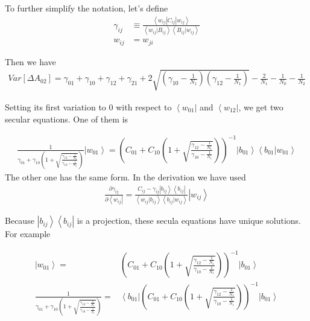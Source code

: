 \documentclass[notitlepage, amsmath, amssymb, aps]{revtex4-1}
\begin{document}
To further simplify the notation, let's define
\begin{align}
    \gamma_{ij} &\equiv \frac{\left<w_{ij}|C_{ij}|w_{ij}\right>}{\left<w_{ij}|B_{ij}\right>\left<B_{ij}|w_{ij}\right>} \\
    w_{ij} &= w_{ji}
\end{align}

Then we have
\begin{align}
    Var[\Delta A_{02}] = \gamma_{01} + \gamma_{10} + \gamma_{12} + \gamma_{21}
                        + 2\sqrt{\left(\gamma_{10} - \frac{1}{N_1}\right)\left(\gamma_{12} - \frac{1}{N_1}\right)}
                        - \frac{2}{N_1} - \frac{1}{N_0} - \frac{1}{N_2}
    \label{eq:var_02}
\end{align}

Setting its first variation to 0 with respect to $\left<w_{01}\right|$ and $\left<w_{12}\right|$, we get two secular equations.
One of them is

\begin{align}
    \frac{1}{\gamma_{01}+\gamma_{10}\left(1+\sqrt{\frac{\gamma_{12}-\frac{1}{N_1}}{\gamma_{10}-\frac{1}{N_1}}}\right)} \left|w_{01}\right> = \left(C_{01}+C_{10}\left(1+\sqrt{\frac{\gamma_{12}-\frac{1}{N_1}}{\gamma_{10}-\frac{1}{N_1}}}\right) \right)^{-1} \left|b_{01}\right>\left<b_{01}|w_{01}\right> 
\end{align}
The other one has the same form.
In the derivation we have used
\begin{align}
    \frac{\partial\gamma_{ij}}{\partial \left<w_{ij}\right|} = \frac{C_{ij} - \gamma_{ij}\left|b_{ij}\right>\left<b_{ij}\right|}{\left<w_{ij}|b_{ij}\right>\left<b_{ij}|w_{ij} \right>}\left|w_{ij}\right>
\end{align}

Because $\left|b_{ij}\right>\left<b_{ij}\right|$ is a projection, these secula equations have unique solutions.
For example

\begin{align}
    \left|w_{01}\right> = & \left(C_{01} + C_{10}\left(1+ \sqrt{\frac{\gamma_{12}-\frac{1}{N_1}}{\gamma_{10}-\frac{1}{N_1}}}\right) \right)^{-1}\left|b_{01}\right> \label{eq:w01} \\
    \frac{1}{\gamma_{01} + \gamma_{10}\left(1+\sqrt{\frac{\gamma_{12}-\frac{1}{N_1}}{\gamma_{10}-\frac{1}{N_1}}} \right)} = & \left<b_{01}\right| \left(C_{01} + C_{10}\left(1+\sqrt{\frac{\gamma_{12}-\frac{1}{N_1}}{\gamma_{10}-\frac{1}{N_1}}} \right) \right)^{-1}\left|b_{01}\right>
\end{align}
\end{document}
